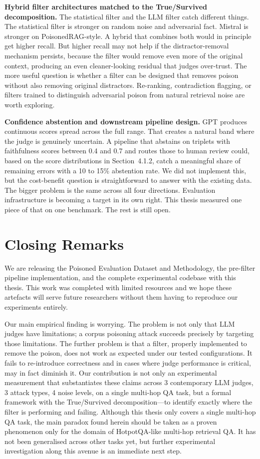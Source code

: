 \textbf{Hybrid filter architectures matched to the True/Survived decomposition.} The statistical filter and the LLM filter catch different things. The statistical filter is stronger on random noise and adversarial fact. Mistral is stronger on PoisonedRAG-style. A hybrid that combines both would in principle get higher recall. But higher recall may not help if the distractor-removal mechanism persists, because the filter would remove even more of the original context, producing an even cleaner-looking residual that judges over-trust. The more useful question is whether a filter can be designed that removes poison without also removing original distractors. Re-ranking, contradiction flagging, or filters trained to distinguish adversarial poison from natural retrieval noise are worth exploring.

\textbf{Confidence abstention and downstream pipeline design.} GPT produces continuous scores spread across the full range. That creates a natural band where the judge is genuinely uncertain. A pipeline that abstains on triplets with faithfulness scores between 0.4 and 0.7 and routes those to human review could, based on the score distributions in Section~4.1.2, catch a meaningful share of remaining errors with a 10 to 15\% abstention rate. We did not implement this, but the cost-benefit question is straightforward to answer with the existing data.
The bigger problem is the same across all four directions. Evaluation infrastructure is becoming a target in its own right. This thesis measured one piece of that on one benchmark. The rest is still open.


\section{Closing Remarks}

We are releasing the Poisoned Evaluation Dataset and Methodology, the pre-filter pipeline implementation, and the complete experimental codebase with this thesis. This work was completed with limited resources and we hope these artefacts will serve future researchers without them having to reproduce our experiments entirely.

Our main empirical finding is worrying. The problem is not only that LLM judges have limitations; a corpus poisoning attack succeeds precisely by targeting those limitations. The further problem is that a filter, properly implemented to remove the poison, does not work as expected under our tested configurations. It fails to re-introduce correctness and in cases where judge performance is critical, may in fact diminish it. Our contribution is not only an experimental measurement that substantiates these claims across 3 contemporary LLM judges, 3 attack types, 4 noise levels, on a single multi-hop QA task, but a formal framework with the True/Survived decomposition---to identify exactly where the filter is performing and failing. Although this thesis only covers a single multi-hop QA task, the main paradox found herein should be taken as a proven phenomenon only for the domain of HotpotQA-like multi-hop retrieval QA. It has not been generalised across other tasks yet, but further experimental investigation along this avenue is an immediate next step.

